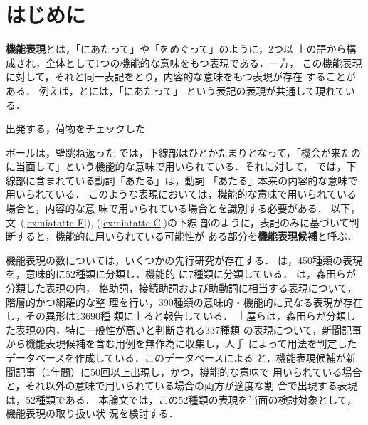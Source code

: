 \documentclass[japanese]{jnlp_1.2d}
\newcommand{\uline}[1]{}
\newcounter{example}
\newenvironment{example}{}{}
\newcommand{\strref}[1]{}
\begin{document}
\maketitle





\section{はじめに}
\label{sec:intro}
{\bfseries 機能表現}とは，「にあたって」や「をめぐって」のように，2つ以
上の語から構成され，全体として1つの機能的な意味をもつ表現である．一方，
この機能表現に対して，それと同一表記をとり，内容的な意味をもつ表現が存在
することがある．
例えば，\strref{ex:niatatte-F}と\strref{ex:niatatte-C}には，「にあたって」
という表記の表現が共通して現れている．
\begin{example}
  \item 出発する\kern0pt\uline{にあたって}，荷物をチェックした\label{ex:niatatte-F}
  \item ボールは，壁\kern0pt\uline{にあたって}跳ね返った\label{ex:niatatte-C}
\end{example}
\strref{ex:niatatte-F}では，下線部はひとかたまりとなって，「機会が来たの
に当面して」という機能的な意味で用いられている．それに対して，
\strref{ex:niatatte-C}では，下線部に含まれている動詞「あたる」は，動詞
「あたる」本来の内容的な意味で用いられている．
このような表現においては，機能的な意味で用いられている場合と，内容的な意
    味で用いられている場合とを識別する必要がある\cite{日本語複合辞用例データベースの作成と分析}．
以下，文~(\ref{ex:niatatte-F}), (\ref{ex:niatatte-C})の下線
部のように，表記のみに基づいて判断すると，機能的に用いられている可能性が
ある部分を{\bf 機能表現候補}と呼ぶ．

機能表現の数については，いくつかの先行研究が存在する．
\cite{日本語表現文型}は，450種類の表現を，意味的に52種類に分類し，機能的
に7種類に分類している．
\cite{階層構造による日本語機能表現の分類}は，森田らが分類した表現の内，
格助詞，接続助詞および助動詞に相当する表現について，階層的かつ網羅的な整
理を行い，390種類の意味的・機能的に異なる表現が存在し，その異形は13690種
類に上ると報告している．
土屋らは，森田らが分類した表現の内，特に一般性が高いと判断される337種類
の表現について，新聞記事から機能表現候補を含む用例を無作為に収集し，人手
によって用法を判定したデータベースを作成している．このデータベースによる
と，機能表現候補が新聞記事（1年間）に50回以上出現し，かつ，機能的な意味で
用いられている場合と，それ以外の意味で用いられている場合の両方が適度な割
合で出現する表現は，52種類である．
本論文では，この52種類の表現を当面の検討対象として，機能表現の取り扱い状
況を検討する．
\end{document}
